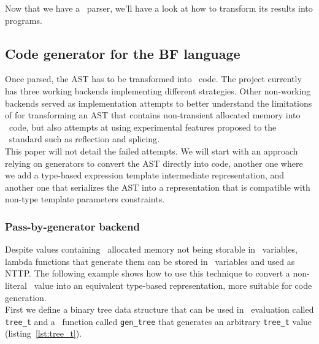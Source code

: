\documentclass[../../main.tex]{subfiles}
\begin{document}
Now that we have a \constexpr~parser, we'll have a look at how to transform its
results into programs.

\subsection{Code generator for the BF language}

Once parsed, the AST has to be transformed into \cpp~code. The project currently
has three working backends implementing different strategies. Other
non-working backends served as implementation attempts to better understand the
limitations of  for transforming an AST that contains non-transient
allocated memory into \cpp~code, but also attempts at using experimental
features proposed to the \cpp~standard such as reflection and
splicing\cite{scalable-reflection}.\\

This paper will not detail the failed attempts. We will start with an approach
relying on generators to convert the AST directly into code, another one where
we add a type-based expression template intermediate representation, and another
one that serializes the AST into a representation that is compatible with
non-type template parameters constraints.

\clearpage%

\subsubsection{Pass-by-generator backend}

Despite values containing \constexpr~allocated memory not being storable in
\constexpr~variables, lambda functions that generate them can be stored in
\constexpr~variables and used as NTTP. The following example shows how to use
this technique to convert a non-literal \constexpr~value into an equivalent
type-based representation, more suitable for code generation.\\

First we define a binary tree data structure that can be used in
\constexpr~evaluation called \lstinline|tree_t| and a
\constexpr~function called \lstinline|gen_tree| that generates an arbitrary
\lstinline|tree_t| value (listing~\ref{lst:tree_t}).


\end{document}
